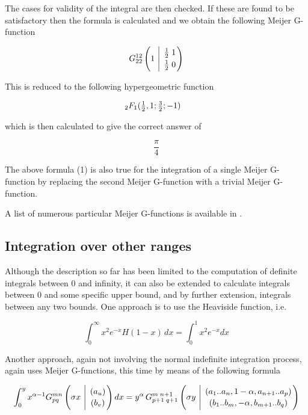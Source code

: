 The cases for validity of the integral are then checked. If these 
are found to be satisfactory then the formula is calculated and we 
obtain the following Meijer G-function 

\begin{displaymath}  
G^{1 2}_{2 2} \left(1 \ \Bigg\vert \ \MeijerGparams{\frac{1}{2} \; 1}{\frac{1}{2} \; 0} \right)
\end{displaymath} 

This is reduced to the following hypergeometric function

\begin{math}
\hspace{50mm} _2F_1 (\frac{1}{2},1;\frac{3}{2};-1 )
\end{math}

which is then calculated to give the correct answer of 

\begin{displaymath}
\frac{\pi}{4}
\end{displaymath}

The above formula (1) is also true for the integration of a single
Meijer G-function by replacing the second Meijer G-function 
with a trivial Meijer G-function.

A list of numerous particular Meijer G-functions is available in 
\cite {Prudnikov:90c}.

\subsection{Integration over other ranges}

Although the description so far has been limited to the computation of
definite integrals between 0 and infinity, it can also be extended to
calculate integrals between 0 and some specific upper bound, and
by further extension, integrals between any two bounds.  One approach is
to use the Heaviside function, i.e.

\begin{displaymath}
\int_{0}^{\infty} x^{2} e^{-x} H(1-x)\,dx = \int_{0}^{1} x^{2} e^{-x}dx
\end{displaymath} 

Another approach, again not involving the normal indefinite integration
process, again uses Meijer G-functions, this time by means of the
following formula

\begin{equation}
\int_{0}^{y} x^{\alpha-1} G^{m n}_{p q} 
\left( \sigma x \  \Bigg\vert \ \MeijerGparams{(a_u)}{(b_v)} \right) dx=%
y^{\alpha}\,G^{m \; n+1}_{p+1 \; q+1} \left( \sigma y \  \Bigg\vert \
\MeijerGparams{( a_1..a_n,1-\alpha,a_{n+1}..a_p)}{(b_1..b_m,-\alpha,b_{m+1}..b_q)} \right) \label{defint:eq2}
\end{equation}

